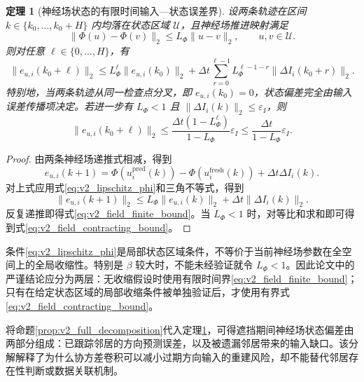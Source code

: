 \documentclass[UTF8,fontset=windows,11pt]{ctexart}
\newtheorem{theorem}{定理}[section]
\begin{document}
\begin{theorem}[神经场状态的有限时间输入—状态误差界]
\label{thm:v2_field_bound}
设两条轨迹在区间 $k\in\{k_0,\ldots,k_0+H\}$ 内均落在状态区域 $\mathcal U$，且神经场推进映射满足
\begin{equation}
 \|\Phi(u)-\Phi(v)\|_2\le L_\Phi\|u-v\|_2,
 \qquad u,v\in\mathcal U.
 \label{eq:v2_lipschitz_phi}
\end{equation}
则对任意 $\ell\in\{0,\ldots,H\}$，有
\begin{equation}
 \|e_{u,i}(k_0+\ell)\|_2
 \le L_\Phi^\ell\|e_{u,i}(k_0)\|_2
 +\Delta t\sum_{r=0}^{\ell-1}
 L_\Phi^{\ell-1-r}\|\Delta I_i(k_0+r)\|_2.
 \label{eq:v2_field_finite_bound}
\end{equation}
特别地，当两条轨迹从同一检查点分叉，即 $e_{u,i}(k_0)=0$，状态偏差完全由输入误差传播项决定。若进一步有 $L_\Phi<1$ 且 $\|\Delta I_i(k)\|_2\le\varepsilon_I$，则
\begin{equation}
 \|e_{u,i}(k_0+\ell)\|_2
 \le
 \frac{\Delta t(1-L_\Phi^\ell)}{1-L_\Phi}\varepsilon_I
 \le\frac{\Delta t}{1-L_\Phi}\varepsilon_I.
 \label{eq:v2_field_contracting_bound}
\end{equation}
\end{theorem}

\begin{proof}
由两条神经场递推式相减，得到
\begin{equation}
 e_{u,i}(k+1)=\Phi(u_i^{\mathrm{pred}}(k))-
 \Phi(u_i^{\mathrm{fresh}}(k))+\Delta t\Delta I_i(k).
 \end{equation}
对上式应用式\eqref{eq:v2_lipschitz_phi}和三角不等式，得到
\begin{equation}
 \|e_{u,i}(k+1)\|_2
 \le L_\Phi\|e_{u,i}(k)\|_2+\Delta t\|\Delta I_i(k)\|_2.
\end{equation}
反复递推即得式\eqref{eq:v2_field_finite_bound}。当 $L_\Phi<1$ 时，对等比和求和即可得到式\eqref{eq:v2_field_contracting_bound}。
\end{proof}

条件\eqref{eq:v2_lipschitz_phi}是局部状态区域条件，不等价于当前神经场参数在全空间上的全局收缩性。特别是 $\beta$ 较大时，不能未经验证就令 $L_\Phi<1$。因此论文中的严谨结论应分为两层：无收缩假设时使用有限时间界\eqref{eq:v2_field_finite_bound}；只有在给定状态区域的局部收缩条件被单独验证后，才使用有界式\eqref{eq:v2_field_contracting_bound}。

将命题\ref{prop:v2_full_decomposition}代入定理\ref{thm:v2_field_bound}，可得遮挡期间神经场状态偏差由两部分组成：已跟踪邻居的方向预测误差，以及被遗漏邻居带来的输入缺口。该分解解释了为什么协方差卷积可以减小过期方向输入的重建风险，却不能替代邻居存在性判断或数据关联机制。
\end{document}
